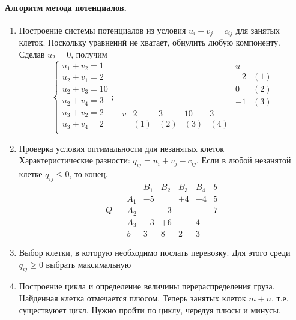 \documentclass[a4paper, 14pt]{extarticle}
\numberwithin{equation}{section}
\begin{document}
\paragraph{Алгоритм метода потенциалов. } 
\begin{enumerate}
    \item Построение системы потенциалов из условия $u_i + v_j = c_{ij}$ для занятых клеток. Поскольку уравнений не хватает, обнулить любую компоненту. Сделав $u_2=0$, получим
    \[ \begin{cases}
        u_1 + v_2 = 1\\
        u_2 + v_1 = 2\\
        u_2 + v_3 = 10\\
        u_2 + v_4 = 3\\
        u_3 + v_2 = 2\\
        u_3 + v_4 = 2\\
    \end{cases}; \ \
    \begin{array}{ccccc|cc}
        & & & & & u & \\
        & & & & & -2 & (1)\\
        & & & & & 0 & (2)\\
        & & & & & -1 & (3)\\
        \hline
        v & 2 & 3 & 10 & 3 & &\\
          & (1) & (2) & (3) & (4)
    \end{array} \]
    \item Проверка условия оптимальности для незанятых клеток\\
    Характеристические разности: $q_{ij} = u_i + v_j - c_{ij}$. Если в любой незанятой клетке $q_{ij} \le 0$, то конец.
    \[ Q = \begin{array}{c|cccc|c}
            & B_1 & B_2 & B_3 & B_4 & b\\
        \hline
        A_1 & -5 & & +4 & -4 & 5 \\
        A_2 & & -3 & & & 7\\
        A_3 & -3 & +6 & & 4\\
        \hline
        b & 3 & 8 & 2 & 3
    \end{array} \]
\item Выбор клетки, в которую необходимо послать перевозку. Для этого среди $q_{ij} \ge 0$ выбрать максимальную
    \item Построение цикла и определение величины перераспределения груза.\\
    Найденная клетка отмечается плюсом. Теперь занятых клеток $m+n$, т.е. существуюет цикл. Нужно пройти по циклу, чередуя плюсы и минусы.

\end{enumerate}
\end{document}

